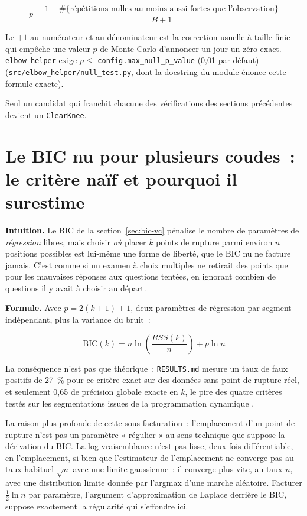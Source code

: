 \documentclass[11pt]{article}
\newcommand{\code}[1]{\texttt{#1}}
\begin{document}
\begin{equation}
p = \frac{1 + \#\{\text{répétitions nulles au moins aussi fortes que l'observation}\}}{B + 1}
\end{equation}

Le $+1$ au numérateur et au dénominateur est la correction usuelle à taille
finie qui empêche une valeur $p$ de Monte-Carlo d'annoncer un jour un zéro
exact. \code{elbow-helper} exige $p \le$ \code{config.max\_null\_p\_value}
(0,01 par défaut) (\code{src/elbow\_helper/null\_test.py}, dont la
docstring du module énonce cette formule exacte).

Seul un candidat qui franchit chacune des vérifications des sections
précédentes devient un \code{ClearKnee}.

\section{Le BIC nu pour plusieurs coudes~: le critère naïf et pourquoi il surestime}

\textbf{Intuition.} Le BIC de la section~\ref{sec:bic-vc} pénalise le
nombre de paramètres de \emph{régression} libres, mais choisir \emph{où}
placer $k$ points de rupture parmi environ $n$ positions possibles est
lui-même une forme de liberté, que le BIC nu ne facture jamais. C'est comme
si un examen à choix multiples ne retirait des points que pour les
mauvaises réponses aux questions tentées, en ignorant combien de questions
il y avait à choisir au départ.

\textbf{Formule.} Avec $p = 2(k+1) + 1$, deux paramètres de régression par
segment indépendant, plus la variance du bruit~:

\begin{equation}
\mathrm{BIC}(k) = n \ln\!\left(\frac{RSS(k)}{n}\right) + p \ln n
\end{equation}

La conséquence n'est pas que théorique~: \code{RESULTS.md} mesure un taux
de faux positifs de 27~\% pour ce critère exact sur des données sans point
de rupture réel, et seulement 0,65 de précision globale exacte en $k$, le
pire des quatre critères testés sur les segmentations issues de la
programmation dynamique \citep{yao1988} \citep{zhangsiegmund2007}.

La raison plus profonde de cette sous-facturation~: l'emplacement d'un
point de rupture n'est pas un paramètre « régulier » au sens technique que
suppose la dérivation du BIC. La log-vraisemblance n'est pas lisse, deux
fois différentiable, en l'emplacement, si bien que l'estimateur de
l'emplacement ne converge pas au taux habituel $\sqrt n$ avec une limite
gaussienne~: il converge plus vite, au taux $n$, avec une distribution
limite donnée par l'argmax d'une marche aléatoire. Facturer
$\frac{1}{2}\ln n$ par paramètre, l'argument d'approximation de Laplace
derrière le BIC, suppose exactement la régularité qui s'effondre ici.
\end{document}
